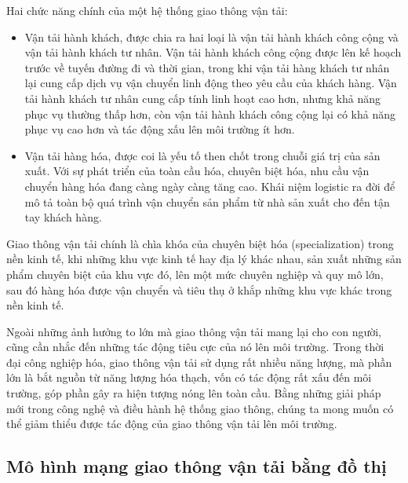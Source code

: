 \documentclass[14pt, oneside, a4paper, openany]{scrartcl}
\begin{document}
Hai chức năng chính của một hệ thống giao thông vận tải:
\begin{itemize}
	\item Vận tải hành khách, được chia ra hai loại là vận tải hành khách công cộng và vận tải hành khách tư nhân. Vận tải hành khách công cộng được lên kế hoạch trước về tuyến đường đi và thời gian, trong khi vận tải hàng khách tư nhân lại cung cấp dịch vụ vận chuyển linh động theo yêu cầu của khách hàng. Vận tải hành khách tư nhân cung cấp tính linh hoạt cao hơn, nhưng khả năng phục vụ thường thấp hơn, còn vận tải hành khách công cộng lại có khả năng phục vụ cao hơn và tác động xấu lên môi trường ít hơn.
	\item Vận tải hàng hóa, được coi là yếu tố then chốt trong chuỗi giá trị của sản xuất. Với sự phát triển của toàn cầu hóa, chuyên biệt hóa, nhu cầu vận chuyển hàng hóa đang càng ngày càng tăng cao. Khái niệm logistic ra đời để mô tả toàn bộ quá trình vận chuyển sản phẩm từ nhà sản xuất cho đến tận tay khách hàng.
\end{itemize}

Giao thông vận tải chính là chìa khóa của chuyên biệt hóa  (specialization) trong nền kinh tế, khi những khu vực kinh tế hay địa lý khác nhau, sản xuất những sản phẩm chuyên biệt của khu vực đó, lên một mức chuyên nghiệp và quy mô lớn, sau đó hàng hóa được vận chuyển và tiêu thụ ở khắp những khu vực khác trong nền kinh tế.

Ngoài những ảnh hưởng to lớn mà giao thông vận tải mang lại cho con người, cũng cần nhắc đến những tác động tiêu cực của nó lên môi trường. Trong thời đại công nghiệp hóa, giao thông vận tải sử dụng rất nhiều năng lượng, mà phần lớn là bắt nguồn từ năng lượng hóa thạch, vốn có tác động rất xấu đến môi trường, góp phần gây ra hiện tượng nóng lên toàn cầu.
Bằng những giải pháp mới trong công nghệ và điều hành hệ thống giao thông, chúng ta mong muốn có thể giảm thiểu được tác động của giao thông vận tải lên môi trường.



\subsection{Mô hình mạng giao thông vận tải bằng đồ thị}
\end{document}
